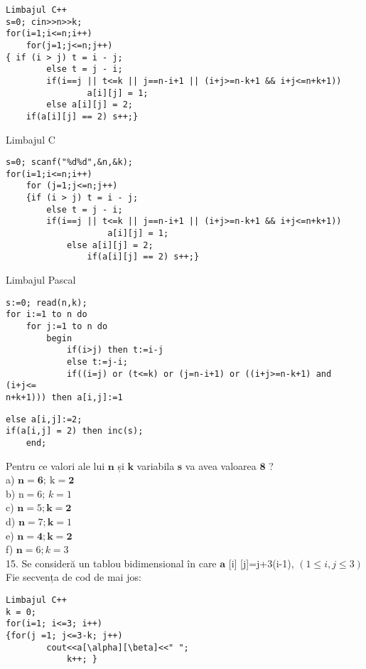 \begin{verbatim}
Limbajul C++
s=0; cin>>n>>k;
for(i=1;i<=n;i++)
    for(j=1;j<=n;j++)
{ if (i > j) t = i - j;
        else t = j - i;
        if(i==j || t<=k || j==n-i+1 || (i+j>=n-k+1 && i+j<=n+k+1))
                a[i][j] = 1;
        else a[i][j] = 2;
    if(a[i][j] == 2) s++;}
\end{verbatim}

Limbajul C

\begin{verbatim}
s=0; scanf("%d%d",&n,&k);
for(i=1;i<=n;i++)
    for (j=1;j<=n;j++)
    {if (i > j) t = i - j;
        else t = j - i;
        if(i==j || t<=k || j==n-i+1 || (i+j>=n-k+1 && i+j<=n+k+1))
                    a[i][j] = 1;
            else a[i][j] = 2;
                if(a[i][j] == 2) s++;}
\end{verbatim}

Limbajul Pascal

\begin{verbatim}
s:=0; read(n,k);
for i:=1 to n do
    for j:=1 to n do
        begin
            if(i>j) then t:=i-j
            else t:=j-i;
            if((i=j) or (t<=k) or (j=n-i+1) or ((i+j>=n-k+1) and (i+j<=
n+k+1))) then a[i,j]:=1
\end{verbatim}

\begin{verbatim}
else a[i,j]:=2;
if(a[i,j] = 2) then inc(s);
    end;
\end{verbatim}

Pentru ce valori ale lui $\mathbf{n}$ și $\mathbf{k}$ variabila $\mathbf{s}$ va avea valoarea $\mathbf{8}$ ?\\
a) $\mathbf{n}=\mathbf{6 ; ~} \mathrm{k}=\mathbf{2}$\\
b) $\mathrm{n}=6$; $k=1$\\
c) $\mathbf{n}=5 ; \mathbf{k}=\mathbf{2}$\\
d) $\mathbf{n}=7 ; \mathbf{k}=1$\\
e) $\mathbf{n}=\mathbf{4} ; \mathbf{k}=\mathbf{2}$\\
f) $\mathbf{n}=6 ; k=3$\\
15. Se consideră un tablou bidimensional în care $\mathbf{a}$ [i] [j]=j+3(i-1), $(1 \leq i, j \leq 3)$ Fie secvența de cod de mai jos:

\begin{verbatim}
Limbajul C++
k = 0;
for(i=1; i<=3; i++)
{for(j =1; j<=3-k; j++)
        cout<<a[\alpha][\beta]<<" ";
            k++; }
\end{verbatim}

